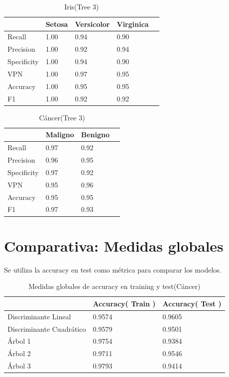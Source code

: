 \documentclass[a4paper,openwrite,12pt]{article}
\begin{document}
\begin{table}[H]
\centering
\begin{tabular}{@{}lllll@{}}
\toprule
            & Setosa & Versicolor & Virginica &  \\ \midrule
Recall      & 1.00   & 0.94       & 0.90      &  \\
Precision   & 1.00   & 0.92       & 0.94      &  \\
Specificity & 1.00   & 0.94       & 0.90      &  \\
VPN         & 1.00   & 0.97       & 0.95      &  \\
Accuracy    & 1.00   & 0.95       & 0.95      &  \\
F1          & 1.00   & 0.92       & 0.92      &  \\ \bottomrule
\end{tabular}
\caption{Iris(Tree 3)}
\end{table}


\begin{table}[H]
\centering
\begin{tabular}{@{}llll@{}}
\toprule
            & Maligno & Benigno &  \\ \midrule
Recall      & 0.97    & 0.92    &  \\
Precision   & 0.96    & 0.95    &  \\
Specificity & 0.97    & 0.92    &  \\
VPN         & 0.95    & 0.96    &  \\
Accuracy    & 0.95    & 0.95    &  \\
F1          & 0.97    & 0.93    &  \\ \bottomrule
\end{tabular}
\caption{Cáncer(Tree 3)}
\end{table}


\section{Comparativa: Medidas globales}
Se utiliza la accuracy en test como métrica para comparar los modelos.


\begin{table}[H]
\centering
\begin{tabular}{@{}lll@{}}
\toprule
                         & Accuracy( Train ) & Accuracy( Test ) \\ \midrule
Discriminante Lineal     & 0.9574            & 0.9605           \\
Discriminante Cuadrático & 0.9579            & 0.9501           \\
Árbol 1                  & 0.9754            & 0.9384           \\
Árbol 2                  & 0.9711            & 0.9546           \\
Árbol 3                  & 0.9793            & 0.9414          
\end{tabular}
\caption{Medidas globales de accuracy en training y test(Cáncer)}
\label{tab:global_cancer}
\end{table}
\end{document}
